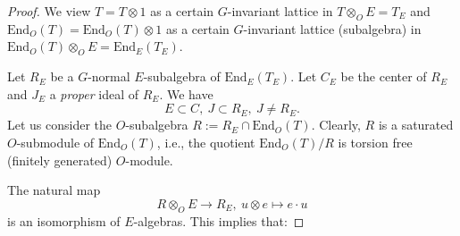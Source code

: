 \documentclass[12pt,a4paper,reqno]{amsart}
\def\End{\mathrm{End}}
\theoremstyle{definition}
\begin{document}
\begin{proof}
We view $T=T\otimes 1$ as a certain  $G$-invariant lattice in $T\otimes_O E=T_E$ and 
$\End_O(T)=\End_O(T)\otimes 1$ as a certain  $G$-invariant lattice (subalgebra) in
$\End_O(T)\otimes_O E=\End_E(T_E)$.

Let $R_E$ be a $G$-normal  $E$-subalgebra of $\End_E(T_E)$. Let $C_E$ be the center of $R_E$ 
and $J_E$ a {\sl proper} ideal of $R_E$. We have
$$E\subset C, \ J \subset R_E, \ J \ne R_E.$$
Let us consider the $O$-subalgebra
$R:=R_E\cap \End_O(T)$.  Clearly,  $R$ is a saturated $O$-submodule of  $\End_O(T)$, i.e.,
the quotient  $\End_O(T)/R$ is torsion free (finitely generated) $O$-module.

The natural map
$$R\otimes_O E\to R_E, \ u \otimes e \mapsto e\cdot u$$
is an isomorphism of $E$-algebras. This implies that:


\end{proof}
\end{document}
